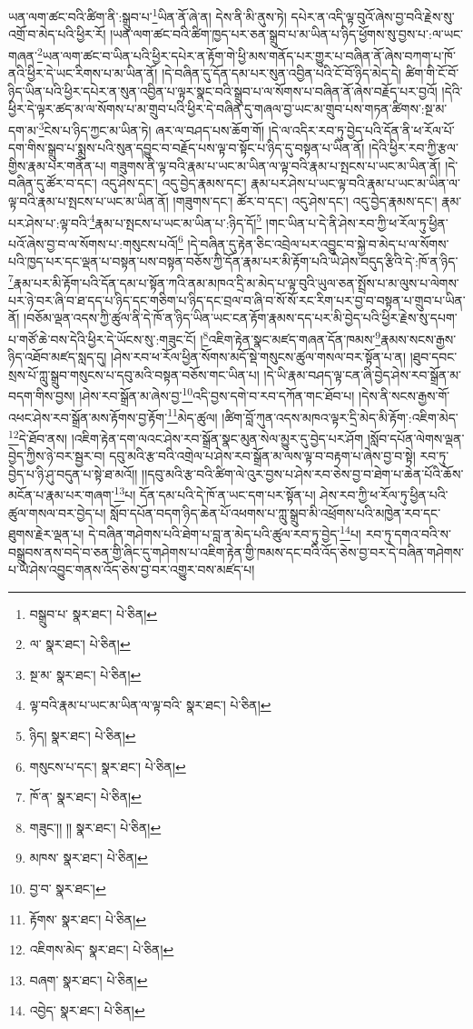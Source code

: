 ཡན་ལག་ཚང་བའི་ཚིག་ནི་:སྒྲུབ་པ་\footnote{བསྒྲུབ་པ་  སྣར་ཐང་།  པེ་ཅིན། }ཡིན་ནོ་ཞེ་ན། དེས་ནི་མི་ནུས་ཏེ། དཔེར་ན་འདི་ལྟ་བུའོ་ཞེས་བྱ་བའི་རྗེས་སུ་འགྲོ་བ་མེད་པའི་ཕྱིར་རོ། །ཡན་ལག་ཚང་བའི་ཚིག་ཁྱད་པར་ཅན་སྒྲུབ་པ་མ་ཡིན་པ་ཉིད་ཕྱོགས་སུ་བྱས་པ་:ལ་ཡང་གཞན་\footnote{ལ་  སྣར་ཐང་།  པེ་ཅིན། }ཡན་ལག་ཚང་བ་ཡིན་པའི་ཕྱིར་དཔེར་ན་རྟོག་གེ་ཕྱི་མས་གནོད་པར་གྱུར་པ་བཞིན་ནོ་ཞེས་བཀག་པ་ཁོ་ནའི་ཕྱིར་དེ་ཡང་རིགས་པ་མ་ཡིན་ནོ། །དེ་བཞིན་དུ་དོན་དམ་པར་སུན་འབྱིན་པའི་ངོ་བོ་ཉིད་མེད་དེ། ཚིག་གི་ངོ་བོ་ཉིད་ཡིན་པའི་ཕྱིར་དཔེར་ན་སུན་འབྱིན་པ་ལྟར་སྣང་བའི་སྒྲུབ་པ་ལ་སོགས་པ་བཞིན་ནོ་ཞེས་བརྗོད་པར་བྱའོ། །དེའི་ཕྱིར་དེ་ལྟར་ཚད་མ་ལ་སོགས་པ་མ་གྲུབ་པའི་ཕྱིར་དེ་བཞིན་དུ་གཞལ་བྱ་ཡང་མ་གྲུབ་པས་གཏན་ཚིགས་:སྔ་མ་དག་མ་\footnote{སྔ་མ་  སྣར་ཐང་།  པེ་ཅིན། }ངེས་པ་ཉིད་ཀྱང་མ་ཡིན་ཏེ། ཞར་ལ་བཤད་པས་ཆོག་གོ། །དེ་ལ་འདིར་རབ་ཏུ་བྱེད་པའི་དོན་ནི་ཕ་རོལ་པོ་དག་གིས་སྒྲུབ་པ་སྨྲས་པའི་སུན་དབྱུང་བ་བརྗོད་པས་ལྟ་བ་སྟོང་པ་ཉིད་དུ་བསྟན་པ་ཡིན་ནོ། །དེའི་ཕྱིར་རབ་ཀྱི་རྩལ་གྱིས་རྣམ་པར་གནོན་པ། གཟུགས་ནི་ལྟ་བའི་རྣམ་པ་ཡང་མ་ཡིན་ལ་ལྟ་བའི་རྣམ་པ་སྤངས་པ་ཡང་མ་ཡིན་ནོ། །དེ་བཞིན་དུ་ཚོར་བ་དང་། འདུ་ཤེས་དང་། འདུ་བྱེད་རྣམས་དང་། རྣམ་པར་ཤེས་པ་ཡང་ལྟ་བའི་རྣམ་པ་ཡང་མ་ཡིན་ལ་ལྟ་བའི་རྣམ་པ་སྤངས་པ་ཡང་མ་ཡིན་ནོ། །གཟུགས་དང་། ཚོར་བ་དང་། འདུ་ཤེས་དང་། འདུ་བྱེད་རྣམས་དང་། རྣམ་པར་ཤེས་པ་:ལྟ་བའི་\footnote{ལྟ་བའི་རྣམ་པ་ཡང་མ་ཡིན་ལ་ལྟ་བའི་  སྣར་ཐང་།  པེ་ཅིན། }རྣམ་པ་སྤངས་པ་ཡང་མ་ཡིན་པ་:ཉིད་དོ།\footnote{ཉིད།  སྣར་ཐང་།  པེ་ཅིན། } །གང་ཡིན་པ་དེ་ནི་ཤེས་རབ་ཀྱི་ཕ་རོལ་ཏུ་ཕྱིན་པའོ་ཞེས་བྱ་བ་ལ་སོགས་པ་:གསུངས་པའོ།\footnote{གསུངས་པ་དང་།  སྣར་ཐང་།  པེ་ཅིན། } །དེ་བཞིན་དུ་རྟེན་ཅིང་འབྲེལ་པར་འབྱུང་བ་སྐྱེ་བ་མེད་པ་ལ་སོགས་པའི་ཁྱད་པར་དང་ལྡན་པ་བསྟན་པས་བསྟན་བཅོས་ཀྱི་དོན་རྣམ་པར་མི་རྟོག་པའི་ཡེ་ཤེས་བདུད་རྩིའི་དེ་:ཁོ་ན་ཉིད་\footnote{ཁོ་ན་  སྣར་ཐང་།  པེ་ཅིན། }རྣམ་པར་མི་རྟོག་པའི་དོན་དམ་པ་སྟོན་ཀའི་ནམ་མཁའ་དྲི་མ་མེད་པ་ལྟ་བུའི་ཡུལ་ཅན་སྤྲོས་པ་མ་ལུས་པ་ལེགས་པར་ཉེ་བར་ཞི་བ་ཐ་དད་པ་ཉིད་དང་གཅིག་པ་ཉིད་དང་བྲལ་བ་ཞི་བ་སོ་སོ་རང་རིག་པར་བྱ་བ་བསྟན་པ་གྲུབ་པ་ཡིན་ནོ། །བཅོམ་ལྡན་འདས་ཀྱི་ཚུལ་ནི་དེ་ཁོ་ན་ཉིད་ཡིན་ཡང་ངན་རྟོག་རྣམས་དད་པར་མི་བྱེད་པའི་ཕྱིར་རྗེས་སུ་དཔག་པ་གཙོ་ཆེ་བས་དེའི་ཕྱིར་དེ་ཡོངས་སུ་:གཟུང་ངོ། །\footnote{གཟུང་།། །།  སྣར་ཐང་།  པེ་ཅིན། }འཇིག་རྟེན་སྣང་མཛད་གཞན་དོན་ཁམས་\footnote{མཁས་  སྣར་ཐང་།  པེ་ཅིན། }རྣམས་སངས་རྒྱས་ཉིད་འཐོབ་མཛད་སླད་དུ། །ཤེས་རབ་ཕ་རོལ་ཕྱིན་སོགས་མདོ་སྡེ་གསུངས་ཚུལ་གསལ་བར་སྟོན་པ་ན། །ཐུབ་དབང་སྲས་པོ་ཀླུ་སྒྲུབ་གསུངས་པ་དབུ་མའི་བསྟན་བཅོས་གང་ཡིན་པ། །དེ་ཡི་རྣམ་བཤད་ལྟ་ངན་ཞི་བྱེད་ཤེས་རབ་སྒྲོན་མ་བདག་གིས་བྱས། །ཤེས་རབ་སྒྲོན་མ་ཞེས་བྱ་\footnote{བྱ་བ་  སྣར་ཐང་། }འདི་བྱས་དགེ་བ་རབ་དཀོན་གང་ཐོབ་པ། །དེས་ནི་སངས་རྒྱས་གོ་འཕང་ཤེས་རབ་སྒྲོན་མས་རྟོགས་བྱ་རྟོག་\footnote{རྟོགས་  སྣར་ཐང་།  པེ་ཅིན། }མེད་ཚུལ། །ཚིག་བློ་ཀུན་འདས་མཁའ་ལྟར་དྲི་མེད་མི་རྟོག་:འཇིག་མེད་\footnote{འཇིགས་མེད་  སྣར་ཐང་།  པེ་ཅིན། }དེ་ཐོབ་ནས། །འཇིག་རྟེན་དག་ལའང་ཤེས་རབ་སྒྲོན་སྣང་མུན་སེལ་མྱུར་དུ་བྱེད་པར་ཤོག །སློབ་དཔོན་ལེགས་ལྡན་བྱེད་ཀྱིས་ཉེ་བར་སྦྱར་བ། དབུ་མའི་རྩ་བའི་འགྲེལ་པ་ཤེས་རབ་སྒྲོན་མ་ལས་ལྟ་བ་བརྟག་པ་ཞེས་བྱ་བ་སྟེ། རབ་ཏུ་བྱེད་པ་ཉི་ཤུ་བདུན་པ་སྟེ་ཐ་མའོ།། །།དབུ་མའི་རྩ་བའི་ཚིག་ལེ་འུར་བྱས་པ་ཤེས་རབ་ཅེས་བྱ་བ་ཐེག་པ་ཆེན་པོའི་ཆོས་མངོན་པ་རྣམ་པར་གཞག་\footnote{བཞག་  སྣར་ཐང་།  པེ་ཅིན། }པ། དོན་དམ་པའི་དེ་ཁོ་ན་ཡང་དག་པར་སྟོན་པ། ཤེས་རབ་ཀྱི་ཕ་རོལ་ཏུ་ཕྱིན་པའི་ཚུལ་གསལ་བར་བྱེད་པ། སློབ་དཔོན་བདག་ཉིད་ཆེན་པོ་འཕགས་པ་ཀླུ་སྒྲུབ་མི་འཕྲོགས་པའི་མཁྱེན་རབ་དང་ཐུགས་རྗེར་ལྡན་པ། དེ་བཞིན་གཤེགས་པའི་ཐེག་པ་བླ་ན་མེད་པའི་ཚུལ་རབ་ཏུ་བྱེད་\footnote{འབྱེད་  སྣར་ཐང་།  པེ་ཅིན། }པ། རབ་ཏུ་དགའ་བའི་ས་བསྒྲུབས་ནས་བདེ་བ་ཅན་གྱི་ཞིང་དུ་གཤེགས་པ་འཇིག་རྟེན་གྱི་ཁམས་དང་བའི་འོད་ཅེས་བྱ་བར་དེ་བཞིན་གཤེགས་པ་ཡེ་ཤེས་འབྱུང་གནས་འོད་ཅེས་བྱ་བར་འགྱུར་བས་མཛད་པ། 